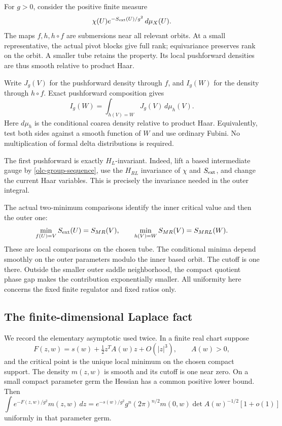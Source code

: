 \documentclass[11pt]{article}
\theoremstyle{remark}
\begin{document}
For $g>0$, consider the positive finite measure
\begin{equation}
              \chi(U)e^{-S_{\rm ext}(U)/g^2}\,d\mu_X(U).
 \label{olc-tube-measure}
\end{equation}
The maps $f,h,h\circ f$ are submersions near all relevant
orbits. At a small representative, the actual pivot blocks
give full rank; equivariance preserves rank on the orbit.
A smaller tube retains the property. Its local pushforward
densities are thus smooth relative to product Haar.

Write $J_g(V)$ for the pushforward density through $f$, and
$I_g(W)$ for the density through $h\circ f$. Exact
pushforward composition gives
\begin{equation}
                I_g(W)=\int_{h(V)=W}J_g(V)\,d\mu_h(V).
 \label{olc-Fubini}
\end{equation}
Here $d\mu_h$ is the conditional coarea density relative to
product Haar. Equivalently, test both sides against a smooth
function of $W$ and use ordinary Fubini. No multiplication
of formal delta distributions is required.

The first pushforward is exactly $H_L$-invariant. Indeed,
lift a based intermediate gauge by
\eqref{olc-group-sequence}, use the $H_{RL}$ invariance of
$\chi$ and $S_{\rm ext}$, and change the current Haar variables.
This is precisely the invariance needed in the outer integral.

The actual two-minimum comparisons identify the inner
critical value and then the outer one:
\begin{equation}
 \min_{f(U)=V}S_{\rm ext}(U)=S_{MR}(V),\qquad
 \min_{h(V)=W}S_{MR}(V)=S_{MRL}(W).
 \label{olc-minimum-values}
\end{equation}
These are local comparisons on the chosen tube.
The conditional minima depend smoothly on the outer
parameters modulo the inner based orbit. The cutoff is one
there. Outside the smaller outer saddle neighborhood, the
compact quotient phase gap makes the contribution
exponentially smaller. All uniformity here concerns the
fixed finite regulator and fixed ratios only.

\subsection{The finite-dimensional Laplace fact}
\label{olc-Laplace-section}

We record the elementary asymptotic used twice. In a finite
real chart suppose
\[
 F(z,w)=s(w)+\tfrac12z^TA(w)z+O(|z|^3),\qquad A(w)>0,
\]
and the critical point is the unique local minimum on the
chosen compact support. The density $m(z,w)$ is smooth and
its cutoff is one near zero. On a small compact parameter
germ the Hessian has a common positive lower bound. Then
\begin{equation}
 \int e^{-F(z,w)/g^2}m(z,w)\,dz
  =e^{-s(w)/g^2}g^n(2\pi)^{n/2}
        m(0,w)\det A(w)^{-1/2}[1+o(1)]
 \label{olc-Laplace}
\end{equation}
uniformly in that parameter germ.
\end{document}

